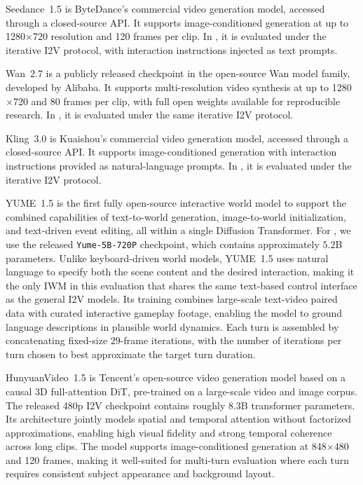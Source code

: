 Seedance~1.5 is ByteDance's commercial video generation model, accessed through a closed-source API.
It supports image-conditioned generation at up to 1280$\times$720 resolution and 120 frames per clip.
In \benchmark, it is evaluated under the iterative I2V protocol, with interaction instructions injected as text prompts.

Wan~2.7 is a publicly released checkpoint in the open-source Wan model family, developed by Alibaba.
It supports multi-resolution video synthesis at up to 1280$\times$720 and 80 frames per clip, with full open weights available for reproducible research.
In \benchmark, it is evaluated under the same iterative I2V protocol.

Kling~3.0 is Kuaishou's commercial video generation model, accessed through a closed-source API.
It supports image-conditioned generation with interaction instructions provided as natural-language prompts.
In \benchmark, it is evaluated under the iterative I2V protocol.

YUME~1.5 is the first fully open-source interactive world model to support the combined capabilities of text-to-world generation, image-to-world initialization, and text-driven event editing, all within a single Diffusion Transformer.
For \benchmark, we use the released \texttt{Yume-5B-720P} checkpoint, which contains approximately $5.2$B parameters.
Unlike keyboard-driven world models, YUME~1.5 uses natural language to specify both the scene content and the desired interaction, making it the only IWM in this evaluation that shares the same text-based control interface as the general I2V models.
Its training combines large-scale text-video paired data with curated interactive gameplay footage, enabling the model to ground language descriptions in plausible world dynamics.
Each turn is assembled by concatenating fixed-size $29$-frame iterations, with the number of iterations per turn chosen to best approximate the target turn duration.

HunyuanVideo~1.5 is Tencent's open-source video generation model based on a causal 3D full-attention DiT, pre-trained on a large-scale video and image corpus.
The released 480p I2V checkpoint contains roughly $8.3$B transformer parameters.
Its architecture jointly models spatial and temporal attention without factorized approximations, enabling high visual fidelity and strong temporal coherence across long clips.
The model supports image-conditioned generation at 848$\times$480 and 120 frames, making it well-suited for multi-turn evaluation where each turn requires consistent subject appearance and background layout.

